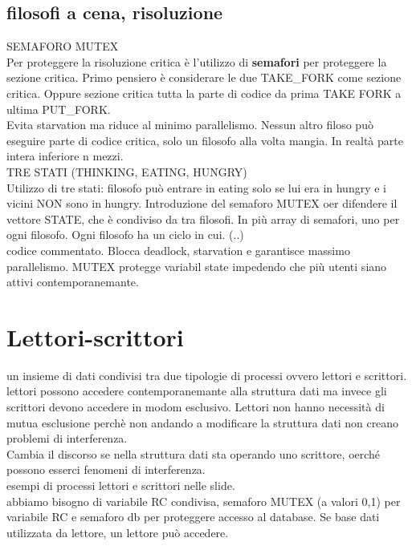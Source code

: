 \documentclass{article}
\begin{document}
\subsection{filosofi a cena, risoluzione}
SEMAFORO MUTEX\\
Per proteggere la risoluzione critica è l'utilizzo di \textbf{semafori} per 
proteggere la sezione critica. Primo pensiero è considerare le due TAKE\_FORK come 
sezione critica. Oppure sezione critica tutta la parte di codice 
da prima TAKE FORK a ultima PUT\_FORK. \\
Evita starvation ma riduce al minimo parallelismo. Nessun altro filoso può eseguire parte 
di codice critica, solo un filosofo alla volta mangia. In realtà parte intera inferiore n mezzi.
\\
TRE STATI (THINKING, EATING, HUNGRY)\\
Utilizzo di tre stati: filosofo può entrare in eating solo 
se lui era in hungry e i vicini NON sono in hungry.
Introduzione del semaforo MUTEX oer difendere il vettore STATE,
che è condiviso da tra filosofi. In più array di semafori, uno 
per ogni filosofo.
Ogni filosofo ha un ciclo in cui. (..) \\
codice commentato. Blocca deadlock, starvation e 
garantisce massimo parallelismo. MUTEX protegge variabil 
state impedendo che più utenti siano attivi contemporanemante.

\section{Lettori-scrittori}
un insieme di dati condivisi tra due tipologie di processi 
ovvero lettori e scrittori.\\
lettori possono accedere contemporanemante alla struttura dati 
ma invece gli scrittori devono accedere in modom esclusivo.
Lettori non hanno necessità di mutua esclusione perchè 
non andando a modificare la struttura dati non creano problemi di interferenza.\\
Cambia il discorso se nella struttura dati sta operando uno scrittore, oerché
possono esserci fenomeni di interferenza.
\\ esempi di processi lettori e scrittori nelle slide.\\
abbiamo bisogno di variabile RC condivisa, semaforo MUTEX (a valori 0,1) 
per variabile RC e semaforo db per proteggere accesso al database.
Se base dati utilizzata da lettore, un lettore può accedere.\\
\end{document}
